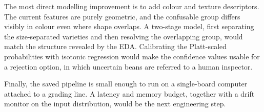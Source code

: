 The most direct modelling improvement is to add colour and texture descriptors.
The current features are purely geometric, and the confusable group differs visibly
in colour even where shape overlaps. A two-stage model, first separating the
size-separated varieties and then resolving the overlapping group, would match the
structure revealed by the EDA. Calibrating the Platt-scaled probabilities with
isotonic regression would make the confidence values usable for a rejection option,
in which uncertain beans are referred to a human inspector.

Finally, the saved pipeline is small enough to run on a single-board computer
attached to a grading line. A latency and memory budget, together with a drift
monitor on the input distribution, would be the next engineering step.
